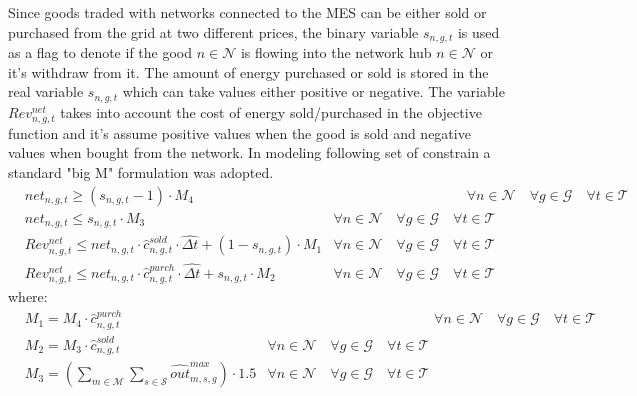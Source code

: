 \documentclass{article}
\newcommand{\cT}{{\mathcal T}}
\newcommand{\cM}{{\mathcal M}}
\newcommand{\cS}{{\mathcal S}}
\newcommand{\cES}{{\mathcal ES}}
\newcommand{\cN}{{\mathcal N}}
\newcommand{\cG}{{\mathcal G}}
\begin{document}
{\begin{comment}
		& l_{es,0}^{stor} = \hat{L}_{es}^{stor,0} \cdot x_{es}^{stor, D} &\forall es \in \cES \label{eq: Stor_init}\\
		& l_{es,0}^{stor} = l_{es, T}^{stor} &\forall es \in \cES \label{eq:Stor_boundaries}
		\end{align}
\end{comment}
Since goods traded with networks connected to the MES can be either sold or purchased from the grid at two different prices, the binary variable $s_{n,g,t}$ is used as a flag to denote if the good $n \in \cN$ is flowing into the network hub $n \in \cN$ or it's withdraw from it. The amount of energy purchased or sold is stored in the real variable $s_{n,g,t}$ which can take values either positive or negative. 
The variable $Rev_{n,g,t}^{net}$ takes into account the cost of energy sold/purchased in the objective function and it's assume positive values when the good is sold and negative values when bought from the network. In modeling following set of constrain a standard "big M" formulation was adopted.  
		\begin{align}
		& net_{n,g,t} \geq (s_{n,g,t} - 1) \cdot M_{4}& \hspace{4cm} \forall n \in \cN \quad \forall g \in \cG \quad \forall t \in \cT \label{eq:Net_1}\\
		& net_{n,g,t} \leq s_{n,g,t} \cdot M_{3} & \forall n \in \cN \quad \forall g \in \cG \quad \forall t \in \cT \label{eq:Net_2}\\
		& Rev_{n,g,t}^{net} \leq net_{n,g,t} \cdot \hat{c}_{n,g,t}^{sold} \cdot \hat{\Delta t} + (1-s_{n,g,t}) \cdot M_{1}&\forall n \in \cN \quad \forall g \in \cG \quad \forall t \in \cT \label{eq:Net_3}\\
		& Rev_{n,g,t}^{net} \leq net_{n,g,t} \cdot \hat{c}_{n,g,t}^{purch} \cdot \hat{\Delta t} + s_{n,g,t} \cdot M_{2} &\forall n \in \cN \quad \forall g \in \cG \quad \forall t \in \cT \label{eq:Net_4}
		\end{align}
		where: 
		\begin{align}
		& M_{1} = M_{4} \cdot \hat{c}_{n,g,t}^{purch} & \hspace{5cm} \forall n \in \cN \quad \forall g \in \cG \quad \forall t \in \cT \label{eq:M1}\\
		& M_{2} = M_{3} \cdot \hat{c}_{n,g,t}^{sold} &\forall n \in \cN \quad \forall g \in \cG \quad \forall t \in \cT \label{eq:M2}\\
		& M_{3} = \left( \sum_{m \in \cM} \sum_{s \in \cS} \hat{out}_{m,s,g}^{max} \right) \cdot 1.5 & \forall n \in \cN \quad \forall g \in \cG \quad \forall t \in \cT \label{eq:M3}\\

\end{align}}
\end{document}
